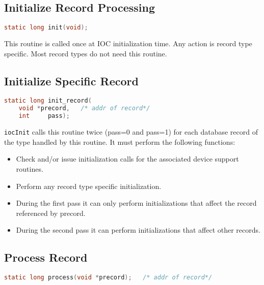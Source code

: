 \subsection{Initialize Record Processing}

\begin{lstlisting}[language=C]
static long init(void);
\end{lstlisting}

This routine is called once at IOC initialization time.
Any action is record type specific.
Most record types do not need this routine.

\subsection{Initialize Specific Record}

\begin{lstlisting}[language=C]
static long init_record(
    void *precord,   /* addr of record*/
    int     pass);
\end{lstlisting}

\verb|iocInit| calls this routine twice (pass=0 and pass=1) for each database record of the type handled by this routine.
It must perform the following functions:

\begin{itemize}
\item Check and/or issue initialization calls for the associated device support routines.

\item Perform any record type specific initialization.

\item During the first pass it can only perform initializations that affect the record referenced by precord.

\item During the second pass it can perform initializations that affect other records.

\end{itemize}

\subsection{Process Record}

\begin{lstlisting}[language=C]
static long process(void *precord);   /* addr of record*/
\end{lstlisting}

